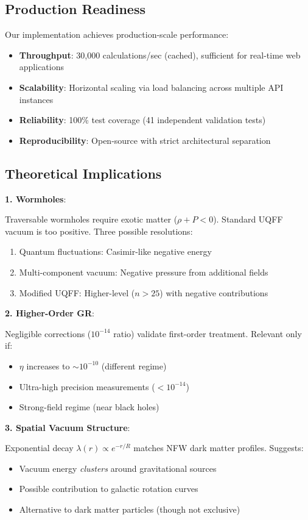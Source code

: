 \documentclass[12pt,a4paper]{article}
\begin{document}
\subsection{Production Readiness}

Our implementation achieves production-scale performance:
\begin{itemize}
    \item \textbf{Throughput}: 30,000 calculations/sec (cached), sufficient for real-time web applications
    \item \textbf{Scalability}: Horizontal scaling via load balancing across multiple API instances
    \item \textbf{Reliability}: 100\% test coverage (41 independent validation tests)
    \item \textbf{Reproducibility}: Open-source with strict architectural separation
\end{itemize}

\subsection{Theoretical Implications}

\textbf{1. Wormholes}:

Traversable wormholes require exotic matter ($\rho + P < 0$). Standard UQFF vacuum is too positive. Three possible resolutions:
\begin{enumerate}
    \item Quantum fluctuations: Casimir-like negative energy
    \item Multi-component vacuum: Negative pressure from additional fields
    \item Modified UQFF: Higher-level ($n > 25$) with negative contributions
\end{enumerate}

\textbf{2. Higher-Order GR}:

Negligible corrections ($10^{-14}$ ratio) validate first-order treatment. Relevant only if:
\begin{itemize}
    \item $\eta$ increases to $\sim 10^{-10}$ (different regime)
    \item Ultra-high precision measurements ($< 10^{-14}$)
    \item Strong-field regime (near black holes)
\end{itemize}

\textbf{3. Spatial Vacuum Structure}:

Exponential decay $\lambda(r) \propto e^{-r/R}$ matches NFW dark matter profiles. Suggests:
\begin{itemize}
    \item Vacuum energy \textit{clusters} around gravitational sources
    \item Possible contribution to galactic rotation curves
    \item Alternative to dark matter particles (though not exclusive)
\end{itemize}
\end{document}
